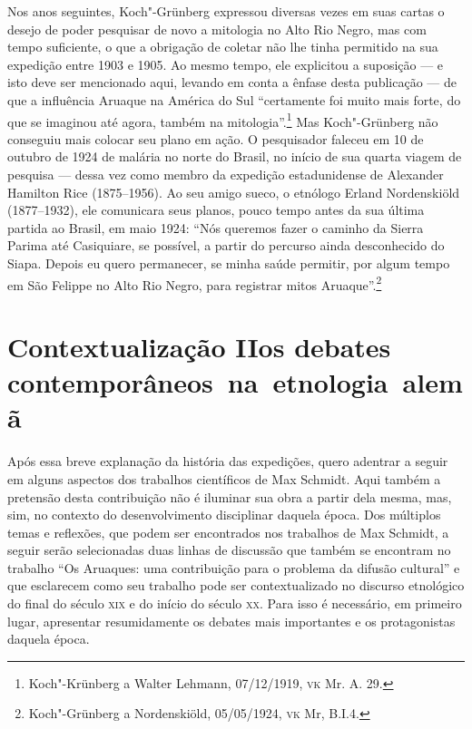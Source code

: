 Nos anos seguintes, Koch"-Grünberg expressou diversas vezes em suas
cartas o desejo de poder pesquisar de novo a mitologia no Alto Rio
Negro, mas com tempo suficiente, o que a obrigação de coletar não lhe
tinha permitido na sua expedição entre 1903 e 1905. Ao mesmo tempo, ele
explicitou a suposição --- e isto deve ser mencionado aqui, levando em
conta a ênfase desta publicação --- de que a influência Aruaque na
América do Sul ``certamente foi muito mais forte, do que se imaginou até
agora, também na mitologia''.\footnote{Koch"-Krünberg a Walter Lehmann,
  07/12/1919, \textsc{vk} Mr. A. 29.} Mas Koch"-Grünberg não conseguiu mais
colocar seu plano em ação. O pesquisador faleceu em 10 de outubro de
1924 de malária no norte do Brasil, no início de sua quarta viagem de
pesquisa --- dessa vez como membro da expedição estadunidense de
Alexander Hamilton Rice (1875--1956). Ao seu amigo sueco, o etnólogo
Erland Nordenskiöld (1877--1932), ele comunicara seus planos, pouco tempo
antes da sua última partida ao Brasil, em maio 1924: ``Nós queremos
fazer o caminho da Sierra Parima até Casiquiare, se possível, a partir
do percurso ainda desconhecido do Siapa. Depois eu quero permanecer, se
minha saúde permitir, por algum tempo em São Felippe no Alto Rio Negro,
para registrar mitos Aruaque''.\footnote{Koch"-Grünberg a Nordenskiöld,
  05/05/1924, \textsc{vk} Mr, B.I.4.}

\section{Contextualização II\break os debates contemporâneos~na~etnologia~alemã}

Após essa breve explanação da história das expedições, quero adentrar a
seguir em alguns aspectos dos trabalhos científicos de Max Schmidt.
Aqui também a pretensão desta contribuição não é iluminar sua obra a
partir dela mesma, mas, sim, no contexto do desenvolvimento disciplinar
daquela época. Dos múltiplos temas e reflexões, que podem ser
encontrados nos trabalhos de Max Schmidt, a seguir serão selecionadas
duas linhas de discussão que também se encontram no trabalho ``Os
Aruaques: uma contribuição para o problema da difusão cultural'' e que
esclarecem como seu trabalho pode ser contextualizado no discurso
etnológico do final do século \textsc{xix} e do início do século \textsc{xx}. Para isso é
necessário, em primeiro lugar, apresentar resumidamente os debates mais
importantes e os protagonistas daquela época.

